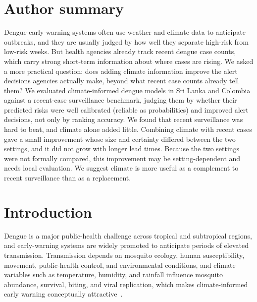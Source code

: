 \documentclass[11pt,a4paper]{article}
\begin{document}
\section*{Author summary}
Dengue early-warning systems often use weather and climate data to anticipate outbreaks, and they are usually judged by how well they separate high-risk from low-risk weeks. But health agencies already track recent dengue case counts, which carry strong short-term information about where cases are rising. We asked a more practical question: does adding climate information improve the alert decisions agencies actually make, beyond what recent case counts already tell them? We evaluated climate-informed dengue models in Sri Lanka and Colombia against a recent-case surveillance benchmark, judging them by whether their predicted risks were well calibrated (reliable as probabilities) and improved alert decisions, not only by ranking accuracy. We found that recent surveillance was hard to beat, and climate alone added little. Combining climate with recent cases gave a small improvement whose size and certainty differed between the two settings, and it did not grow with longer lead times. Because the two settings were not formally compared, this improvement may be setting-dependent and needs local evaluation. We suggest climate is more useful as a complement to recent surveillance than as a replacement.

\section{Introduction}

Dengue is a major public-health challenge across tropical and subtropical regions, and early-warning systems are widely promoted to anticipate periods of elevated transmission. Transmission depends on mosquito ecology, human susceptibility, movement, public-health control, and environmental conditions, and climate variables such as temperature, humidity, and rainfall influence mosquito abundance, survival, biting, and viral replication, which makes climate-informed early warning conceptually attractive~\cite{Mordecai2017,Huber2018}.
\end{document}
